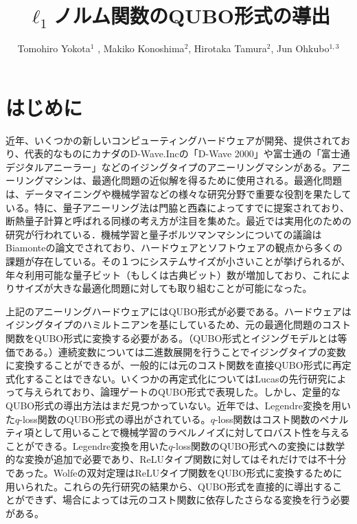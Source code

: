 \documentclass[fp,twocolumn]{jpsj3}
\title{$\ell_{1}$ノルム関数のQUBO形式の導出}
\author{Tomohiro Yokota$^1$%
  , Makiko Konoshima$^2$, Hirotaka Tamura$^2$, Jun Ohkubo$^{1,3}$}
\begin{document}
\maketitle

\section{はじめに}
近年、いくつかの新しいコンピューティングハードウェアが開発、提供されており、代表的なものにカナダのD-Wave.Incの「D-Wave 2000」や富士通の「富士通デジタルアニーラー」などのイジングタイプのアニーリングマシンがある。アニーリングマシンは、最適化問題の近似解を得るために使用される。最適化問題は、データマイニングや機械学習などの様々な研究分野で重要な役割を果たしている。特に、量子アニーリング法は門脇と西森によってすでに提案されており、断熱量子計算と呼ばれる同様の考え方が注目を集めた。最近では実用化のための研究が行われている．機械学習と量子ボルツマンマシンについての議論はBiamonteの論文でされており、ハードウェアとソフトウェアの観点から多くの課題が存在している。その１つにシステムサイズが小さいことが挙げられるが、年々利用可能な量子ビット（もしくは古典ビット）数が増加しており、これによりサイズが大きな最適化問題に対しても取り組むことが可能になった。

上記のアニーリングハードウェアにはQUBO形式が必要である。ハードウェアはイジングタイプのハミルトニアンを基にしているため、元の最適化問題のコスト関数をQUBO形式に変換する必要がある。（QUBO形式とイジングモデルとは等価である。）連続変数については二進数展開を行うことでイジングタイプの変数に変換することができるが、一般的には元のコスト関数を直接QUBO形式に再定式化することはできない。いくつかの再定式化についてはLucasの先行研究によって与えられており、論理ゲートのQUBO形式で表現した。しかし、定量的なQUBO形式の導出方法はまだ見つかっていない。近年では、Legendre変換を用いた$q$-loss関数のQUBO形式の導出がされている。$q$-loss関数はコスト関数のペナルティ項として用いることで機械学習のラベルノイズに対してロバスト性を与えることができる。Legendre変換を用いた$q$-loss関数のQUBO形式への変換には数学的な変換が追加で必要であり、ReLUタイプ関数に対してはそれだけでは不十分であった。Wolfeの双対定理はReLUタイプ関数をQUBO形式に変換するために用いられた。これらの先行研究の結果から、QUBO形式を直接的に導出することができず、場合によっては元のコスト関数に依存したさらなる変換を行う必要がある。
\end{document}
